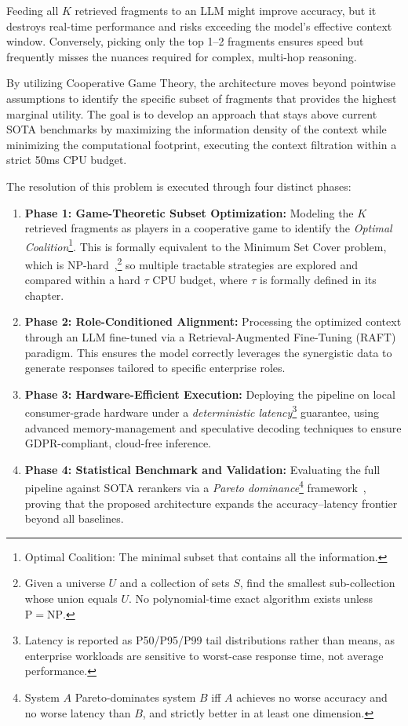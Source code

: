 Feeding all $K$ retrieved fragments to an LLM might improve accuracy, but it destroys real-time performance and risks exceeding the model's effective context window. Conversely, picking only the top 1--2 fragments ensures speed but frequently misses the nuances required for complex, multi-hop reasoning.



By utilizing Cooperative Game Theory, the architecture moves beyond pointwise assumptions to identify the specific subset of fragments that provides the highest marginal utility. The goal is to develop an approach that stays above current SOTA benchmarks by maximizing the information density of the context while minimizing the computational footprint, executing the context filtration within a strict 50ms CPU budget.


The resolution of this problem is executed through four distinct phases:

\begin{enumerate}
    \item \textbf{Phase 1: Game-Theoretic Subset Optimization:} Modeling the $K$ retrieved fragments as players in a cooperative game to identify the \emph{Optimal Coalition}\footnote{Optimal Coalition: The minimal subset that contains all the information.}. This is formally equivalent to the Minimum Set Cover problem, which is NP-hard~\cite{karp1972reducibility, garey1979computers},\footnote{Given a universe $U$ and a collection of sets $S$, find the smallest sub-collection whose union equals $U$. No polynomial-time exact algorithm exists unless $\mathrm{P} = \mathrm{NP}$.} so multiple tractable strategies are explored and compared within a hard $\tau$ CPU budget, where $\tau$ is formally defined in its chapter.

    \item \textbf{Phase 2: Role-Conditioned Alignment:} Processing the optimized context through an LLM fine-tuned via a Retrieval-Augmented Fine-Tuning (RAFT) paradigm. This ensures the model correctly leverages the synergistic data to generate responses tailored to specific enterprise roles.

    \item \textbf{Phase 3: Hardware-Efficient Execution:} Deploying the pipeline on local consumer-grade hardware under a \emph{deterministic latency}\footnote{Latency is reported as P50/P95/P99 tail distributions rather than means, as enterprise workloads are sensitive to worst-case response time, not average performance.} guarantee, using advanced memory-management and speculative decoding techniques to ensure GDPR-compliant, cloud-free inference.

    \item \textbf{Phase 4: Statistical Benchmark and Validation:} Evaluating the full pipeline against SOTA rerankers via a \emph{Pareto dominance}\footnote{System $A$ Pareto-dominates system $B$ iff $A$ achieves no worse accuracy and no worse latency than $B$, and strictly better in at least one dimension.} framework~\cite{PE}, proving that the proposed architecture expands the accuracy--latency frontier beyond all baselines.
\end{enumerate}


